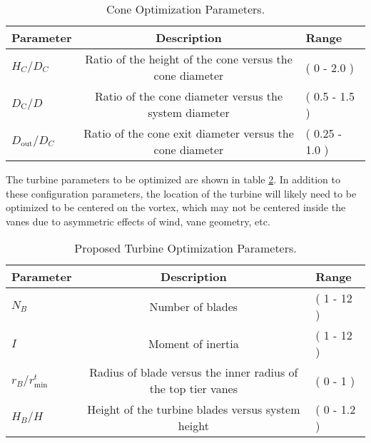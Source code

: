 %
%
\large
\begin{center}
\begin{table}[h]
 \centering
  \begin{tabular}{| l | c | l |}
    \hline
    Parameter & Description & Range \\
    \hline
    $H_C/D_C$ & Ratio of the height of the cone versus the cone diameter & ( 0 - 2.0 ) \\
    $D_{\text{C}}/D$ & Ratio of the cone diameter versus the system
       diameter & ( 0.5 - 1.5 ) \\
    $D_{\text{out}}/D_C$ & Ratio of the cone exit diameter versus the
       cone diameter & ( 0.25 - 1.0 ) \\ 
    \hline
  \end{tabular}
  \caption{Cone Optimization Parameters.}
  \label{tab:cone}
\end{table}
\end{center}
\normalsize

The turbine parameters to be optimized are shown in table
\ref{tab:turbine}. In addition to these configuration parameters, the
location of the turbine will likely need to be optimized to be centered
on the vortex, which may not be centered inside the vanes due to
asymmetric effects of wind, vane geometry, etc. 

%
%
\large
\begin{center}
\begin{table}[h]
 \centering
  \begin{tabular}{| l | c | l |}
    \hline
    Parameter & Description & Range \\
    \hline
    $N_B$ & Number of blades & ( 1 - 12 ) \\
    $I$ & Moment of inertia & ( 1 - 12 ) \\
    $r_B/r_{\text{min}}^t$ & Radius of blade versus the inner radius of
       the top tier vanes & ( 0 - 1 ) \\
   $H_B/H$ & Height of the turbine blades versus system height & ( 0 - 1.2 ) \\
    \hline
  \end{tabular}
  \caption{Proposed Turbine Optimization Parameters.}
  \label{tab:turbine}
\end{table}
\end{center}
\normalsize

